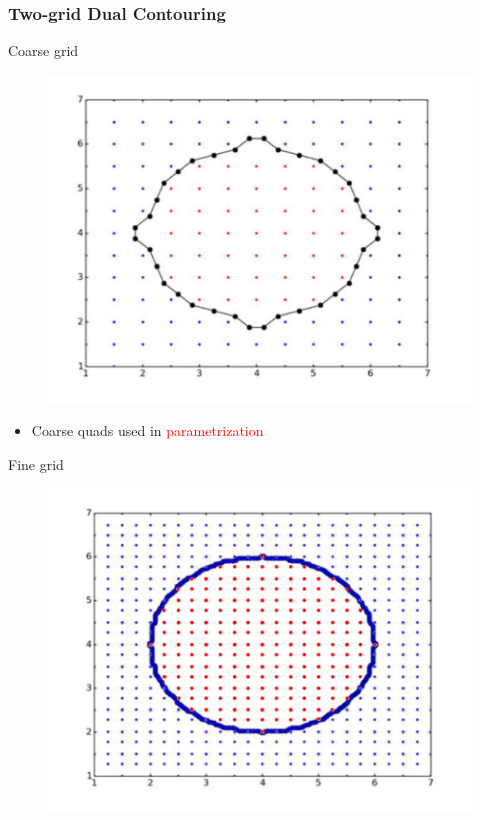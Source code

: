 \begin{frame}
\frametitle{Two-grid Dual Contouring}
\begin{overlayarea}{\textwidth}{0.9\textheight}
	\begin{minipage}{0.45\textwidth}
	\begin{block}{\centering Coarse grid}
	\vspace{-0.5cm}
	\begin{figure}
	\includegraphics[scale=0.35]{Pictures/DC/DC_1_Coarse.pdf}
	\end{figure}
	\begin{itemize}
	\item Coarse quads used in \textcolor{red}{parametrization}
	\end{itemize}
	\end{block}
	\end{minipage}
	\hfill%
	\begin{minipage}{0.45\textwidth}
	\begin{block}{\centering Fine grid}
	\vspace{-0.5cm}
	\begin{figure}
	\includegraphics[scale=0.35]{Pictures/DC/DC_1_Fine.pdf}

\end{figure}
\end{block}
\end{minipage}
\end{overlayarea}
\end{frame}
